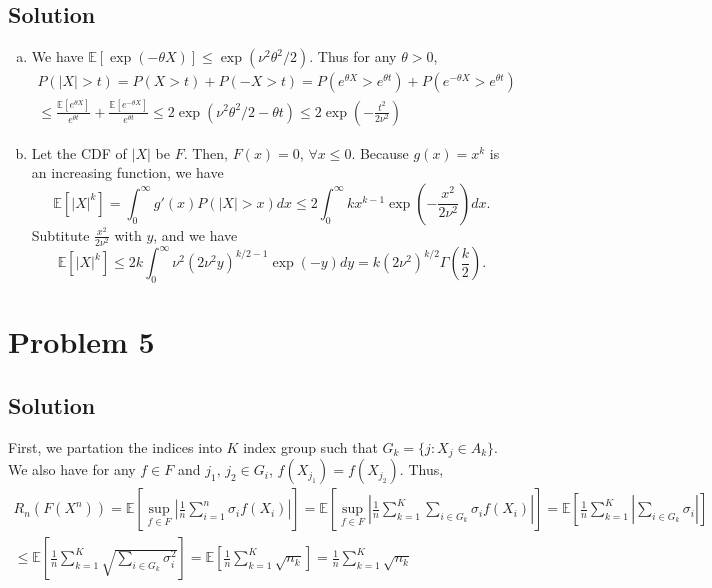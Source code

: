 \documentclass[11pt]{report}
\newcommand{\E}[1]{\mathbb{E}\left[#1\right]}
\begin{document}
\subsection*{Solution}
\begin{enumerate}[(a)]
  \item
  We have $\E{\exp(-\theta X)} \leq \exp(\nu^2\theta^2/2)$. Thus for any $\theta > 0$,
  \begin{multline*}
    P(|X| > t) = P(X > t) + P(-X > t) = P(e^{\theta X} > e^{\theta t}) + P(e^{-\theta X} > e^{\theta t}) \\\leq \frac{\E{e^{\theta X}}}{e^{\theta t}} + \frac{\E{e^{-\theta X}}}{e^{\theta t}} \leq 2 \exp(\nu^2\theta^2/2  - \theta t) \leq 2 \exp(-\frac{t^2}{2 \nu^2})
  \end{multline*}
  \item Let the CDF of $|X|$ be $F$. Then, $F(x) = 0$, $\forall x \leq 0$. Because $g(x) = x^k$ is an increasing function, we have $$\E{|X|^k} = \int_{0}^{\infty} g'(x) P(|X|>x) dx \leq 2 \int_{0}^{\infty} kx^{k-1} \exp(-\frac{x^2}{2 \nu^2}) dx.$$ Subtitute $\frac{x^2}{2 \nu^2}$ with $y$, and we have $$\E{|X|^k} \leq 2 k \int_{0}^{\infty} \nu^2 (2 \nu^2 y)^{k/2-1} \exp(-y) dy = k (2\nu^2)^{k/2} \Gamma(\frac{k}{2}).$$
\end{enumerate}
\section*{Problem 5}
\subsection*{Solution}
First, we partation the indices into $K$ index group such that $G_k = \{j: X_j \in A_k\}$. We also have for any $f \in F$ and $j_1,\,j_2 \in G_i$, $f(X_{j_1}) = f(X_{j_2})$. Thus,
\begin{multline*}
  R_n(F(X^n)) = \E{\sup\limits_{f \in F} \left|\frac{1}{n}\sum_{i=1}^{n}\sigma_i f(X_i)\right|} = \E{\sup\limits_{f \in F} \left|\frac{1}{n}\sum_{k=1}^{K} \sum_{i \in G_k} \sigma_i f(X_i)\right|} = \E{\frac{1}{n}\sum_{k=1}^{K} \left|\sum_{i \in G_k} \sigma_i\right|} \\\leq \E{\frac{1}{n}\sum_{k=1}^{K} \sqrt{\sum_{i \in G_k} \sigma_i^2}} = \E{\frac{1}{n}\sum_{k=1}^{K} \sqrt{n_k}} = \frac{1}{n}\sum_{k=1}^{K} \sqrt{n_k}
\end{multline*}
\end{document}
